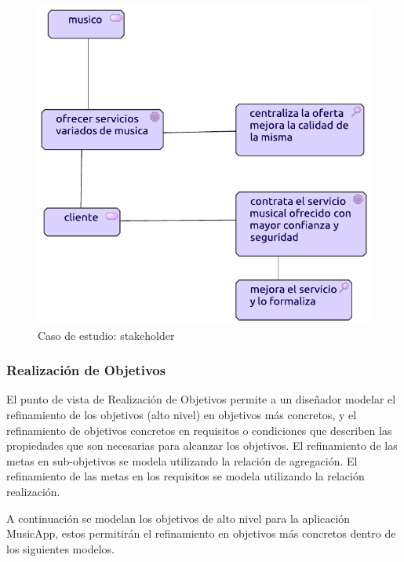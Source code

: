 \begin{figure}[h!]
	\centering
	\includegraphics[width=0.7\linewidth]{Desarrollo/ArquitecturaEmpresarial/Motivacion/imgs/stakeholder.pdf}
	\caption{Caso de estudio: stakeholder}
	\label{fig:comportamiento}
\end{figure}

\newpage

\subsubsection{Realización de Objetivos}
El punto de vista de Realización de Objetivos permite a un diseñador modelar el refinamiento de los objetivos (alto nivel) en objetivos más concretos, y el refinamiento de objetivos concretos en requisitos o condiciones que describen las propiedades que son necesarias para alcanzar los objetivos. El refinamiento de las metas en sub-objetivos se modela utilizando la relación de agregación. El refinamiento de las metas en los requisitos se modela utilizando la relación realización.  \vspace{\baselineskip}

A continuación se modelan los objetivos de alto nivel para la aplicación MusicApp, estos permitirán el refinamiento en objetivos más concretos dentro de los siguientes modelos.

